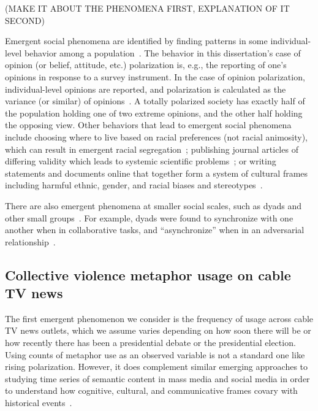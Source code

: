 \documentclass[12pt,letterpaper]{article}
\begin{document}
(MAKE IT ABOUT THE PHENOMENA FIRST, EXPLANATION OF IT SECOND)

Emergent social phenomena are identified by finding patterns in some 
individual-level behavior among a population~\cite{Blau1974,Schelling2006}.
The behavior in this dissertation's case of opinion (or belief, attitude, etc.) 
polarization is, e.g., the reporting of one's opinions in response to a survey
instrument. 
In the case of opinion polarization, 
individual-level opinions are reported, and polarization is calculated 
as the variance (or similar) of opinions~\cite{Bramson2016}. A totally polarized society has
exactly half of the population holding one of two extreme opinions, and the
other half holding the opposing view. 
Other behaviors that lead to emergent social phenomena 
include choosing where to live based on racial preferences (not racial animosity), 
which can result in emergent racial segregation~\cite{Schelling1971}; publishing journal 
articles of differing validity which leads to systemic scientific problems~\cite{Smaldino2019};
or writing statements and documents online that together form a system of 
cultural frames including harmful ethnic, gender, and racial biases and 
stereotypes~\cite{Caliskan2017,Garg2018}. 

There are also emergent phenomena
at smaller social scales, such as dyads and other small groups~\cite{Abney2014a}. 
For example, dyads were found to synchronize with one another when in collaborative
tasks, and ``asynchronize'' when in an adversarial 
relationship~\cite{Abney2014,Ramirez-Aristizabal2018,Schloesser2019,Schneider2020,Abney2021}.



\subsection{Collective violence metaphor usage on cable TV news}

The first emergent phenomenon we consider is the frequency of usage across
cable TV news outlets, which we assume varies depending on how soon there will
be or how recently there has been a presidential debate or the presidential 
election. Using counts of metaphor use as an observed variable 
is not a standard one like rising polarization. However, it does 
complement similar emerging approaches to studying time series of semantic content in
mass media and social media in order to understand how cognitive, cultural, and
communicative frames covary with historical 
events~\cite{Nunn2012,Klingenstein2014,Hamilton2016c,Caliskan2017,Barron2018,Garg2018}. 
\end{document}
